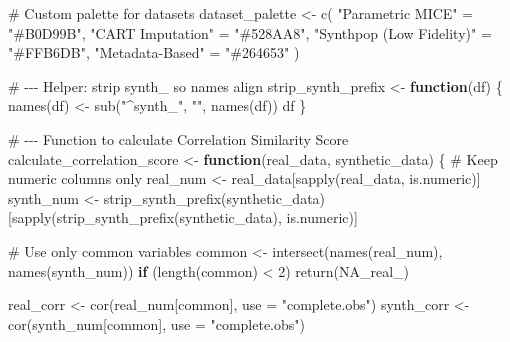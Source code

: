 \documentclass[
  letterpaper,
  DIV=11,
  numbers=noendperiod]{scrartcl}
\newenvironment{Shaded}{\begin{snugshade}}{\end{snugshade}}
\newcommand{\AttributeTok}[1]{\textcolor[rgb]{0.40,0.45,0.13}{#1}}
\newcommand{\CommentTok}[1]{\textcolor[rgb]{0.37,0.37,0.37}{#1}}
\newcommand{\ConstantTok}[1]{\textcolor[rgb]{0.56,0.35,0.01}{#1}}
\newcommand{\ControlFlowTok}[1]{\textcolor[rgb]{0.00,0.23,0.31}{\textbf{#1}}}
\newcommand{\DecValTok}[1]{\textcolor[rgb]{0.68,0.00,0.00}{#1}}
\newcommand{\FunctionTok}[1]{\textcolor[rgb]{0.28,0.35,0.67}{#1}}
\newcommand{\NormalTok}[1]{\textcolor[rgb]{0.00,0.23,0.31}{#1}}
\newcommand{\OtherTok}[1]{\textcolor[rgb]{0.00,0.23,0.31}{#1}}
\newcommand{\SpecialCharTok}[1]{\textcolor[rgb]{0.37,0.37,0.37}{#1}}
\newcommand{\StringTok}[1]{\textcolor[rgb]{0.13,0.47,0.30}{#1}}
\begin{document}
\begin{Shaded}
\begin{Highlighting}[]
\CommentTok{\# Custom palette for datasets}
\NormalTok{dataset\_palette }\OtherTok{\textless{}{-}} \FunctionTok{c}\NormalTok{(}
  \StringTok{"Parametric MICE"}         \OtherTok{=} \StringTok{"\#B0D99B"}\NormalTok{,}
  \StringTok{"CART Imputation"}         \OtherTok{=} \StringTok{"\#528AA8"}\NormalTok{,}
  \StringTok{"Synthpop (Low Fidelity)"} \OtherTok{=} \StringTok{"\#FFB6DB"}\NormalTok{,}
  \StringTok{"Metadata{-}Based"}          \OtherTok{=} \StringTok{"\#264653"}
\NormalTok{)}

\CommentTok{\# {-}{-}{-} Helper: strip \textquotesingle{}synth\_\textquotesingle{} so names align}
\NormalTok{strip\_synth\_prefix }\OtherTok{\textless{}{-}} \ControlFlowTok{function}\NormalTok{(df) \{}
  \FunctionTok{names}\NormalTok{(df) }\OtherTok{\textless{}{-}} \FunctionTok{sub}\NormalTok{(}\StringTok{"\^{}synth\_"}\NormalTok{, }\StringTok{""}\NormalTok{, }\FunctionTok{names}\NormalTok{(df))}
\NormalTok{  df}
\NormalTok{\}}

\CommentTok{\# {-}{-}{-} Function to calculate Correlation Similarity Score}
\NormalTok{calculate\_correlation\_score }\OtherTok{\textless{}{-}} \ControlFlowTok{function}\NormalTok{(real\_data, synthetic\_data) \{}
  \CommentTok{\# Keep numeric columns only}
\NormalTok{  real\_num  }\OtherTok{\textless{}{-}}\NormalTok{ real\_data[}\FunctionTok{sapply}\NormalTok{(real\_data, is.numeric)]}
\NormalTok{  synth\_num }\OtherTok{\textless{}{-}} \FunctionTok{strip\_synth\_prefix}\NormalTok{(synthetic\_data)[}\FunctionTok{sapply}\NormalTok{(}\FunctionTok{strip\_synth\_prefix}\NormalTok{(synthetic\_data), is.numeric)]}
  
  \CommentTok{\# Use only common variables}
\NormalTok{  common }\OtherTok{\textless{}{-}} \FunctionTok{intersect}\NormalTok{(}\FunctionTok{names}\NormalTok{(real\_num), }\FunctionTok{names}\NormalTok{(synth\_num))}
  \ControlFlowTok{if}\NormalTok{ (}\FunctionTok{length}\NormalTok{(common) }\SpecialCharTok{\textless{}} \DecValTok{2}\NormalTok{) }\FunctionTok{return}\NormalTok{(}\ConstantTok{NA\_real\_}\NormalTok{)}
  
\NormalTok{  real\_corr  }\OtherTok{\textless{}{-}} \FunctionTok{cor}\NormalTok{(real\_num[common],  }\AttributeTok{use =} \StringTok{"complete.obs"}\NormalTok{)}
\NormalTok{  synth\_corr }\OtherTok{\textless{}{-}} \FunctionTok{cor}\NormalTok{(synth\_num[common], }\AttributeTok{use =} \StringTok{"complete.obs"}\NormalTok{)}
  

\end{Highlighting}
\end{Shaded}
\end{document}
